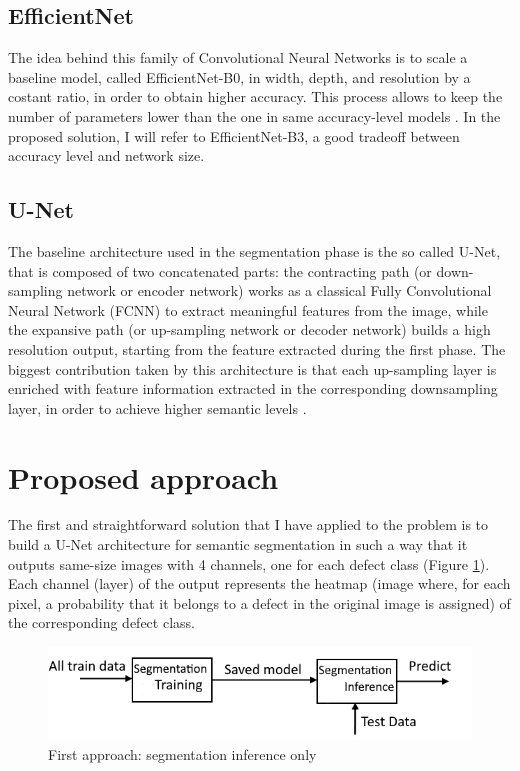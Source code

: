 \documentclass[10pt,twocolumn,letterpaper]{article}
\begin{document}
   \subsection{EfficientNet}
      The idea behind this family of Convolutional Neural Networks is to scale a baseline model, called EfficientNet-B0, in width, depth, and resolution by a costant ratio, in order to obtain higher accuracy. This process allows to keep the number of parameters lower than the one in same accuracy-level models \cite{efficientnet}. In the proposed solution, I will refer to EfficientNet-B3, a good tradeoff between accuracy level and network size.
   \subsection{U-Net}
      The baseline architecture used in the segmentation phase is the so called U-Net, that is composed of two concatenated parts: the contracting path (or down-sampling network or encoder network) works as a classical Fully Convolutional Neural Network (FCNN) to extract meaningful features from the image, while the expansive path (or up-sampling network or decoder network) builds a high resolution output, starting from the feature extracted during the first phase. The biggest contribution taken by this architecture is that each up-sampling layer is enriched with feature information extracted in the corresponding downsampling layer, in order to achieve higher semantic levels \cite{Unet}. 



\section{Proposed approach}
   The first and straightforward solution that I have applied to the problem is to build a U-Net architecture for semantic segmentation in such a way that it outputs same-size images with 4 channels, one for each defect class (Figure \ref{fig:firstApproach}).  
   Each channel (layer) of the output represents the heatmap (image where, for each pixel, a probability that it belongs to a defect in the original image is assigned) of the corresponding defect class. 

   \begin{figure}[h]
      \centering
      \caption{First approach: segmentation inference only} \label{fig:firstApproach}
      \includegraphics[scale=0.55]{Img_FirstApproach}
   \end{figure}
\end{document}
